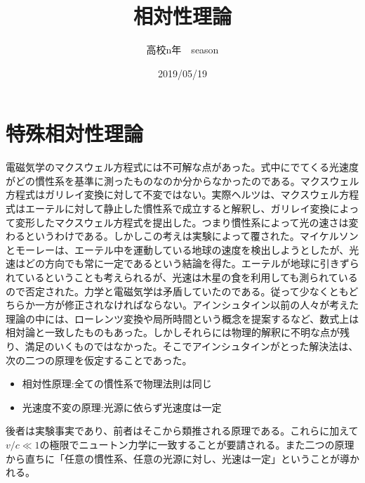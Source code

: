 \documentclass{jsarticle}
\begin{document}
\title{相対性理論}
\author{高校n年　season}
\date{2019/05/19}
\maketitle
\tableofcontents
\newcommand{\repart}[1]{\part{#1}\setcounter{section}{0}}
\newcommand{\lr}[1]{\left(#1 \right)}
\newcommand{\mlr}[1]{\left\{#1 \right\}}
\newcommand{\llr}[1]{\left[#1 \right]}
\newcommand{\rec}[1]{\frac{1}{#1}}
\newcommand{\di}[2][]{\frac{d #1}{d #2}}
\newcommand{\dd}[2][]{\frac{d^2 #1}{d #2^2}}
\newcommand{\pd}[2][]{\frac{\partial #1}{\partial #2}}
\newcommand{\ppd}[3]{\frac{\partial^2 #1}{\partial #2\partial #3}}
\newcommand{\pmat}[1]{\begin{pmatrix} #1 \end{pmatrix}}
\newcommand{\co}[1][]{\cos^{#1}\theta}
\newcommand{\si}[1][]{\sin^{#1}\theta}
\newcommand{\na}{\nabla}
\newcommand{\ga}{\gamma}
\newcommand{\Ga}{\Gamma}
\newcommand{\grad}{\mathrm{grad}}
\newcommand{\dive}{\mathrm{div}}
\newcommand{\rot}{\mathrm{rot}}
\newcommand{\pa}{\partial}
\newcommand{\chr}[2]{\left\{#1 \atop #2\right\}}
\part{特殊相対性理論}
    電磁気学のマクスウェル方程式には不可解な点があった。式中にでてくる光速度がどの慣性系を基準に測ったものなのか分からなかったのである。マクスウェル方程式はガリレイ変換に対して不変ではない。実際ヘルツは、マクスウェル方程式はエーテルに対して静止した慣性系で成立すると解釈し、ガリレイ変換によって変形したマクスウェル方程式を提出した。つまり慣性系によって光の速さは変わるというわけである。しかしこの考えは実験によって覆された。マイケルソンとモーレーは、エーテル中を運動している地球の速度を検出しようとしたが、光速はどの方向でも常に一定であるという結論を得た。エーテルが地球に引きずられているということも考えられるが、光速は木星の食を利用しても測られているので否定された。力学と電磁気学は矛盾していたのである。従って少なくともどちらか一方が修正されなければならない。アインシュタイン以前の人々が考えた理論の中には、ローレンツ変換や局所時間という概念を提案するなど、数式上は相対論と一致したものもあった。しかしそれらには物理的解釈に不明な点が残り、満足のいくものではなかった。そこでアインシュタインがとった解決法は、次の二つの原理を仮定することであった。
    \begin{itemize}
        \item 相対性原理:全ての慣性系で物理法則は同じ
        \item 光速度不変の原理:光源に依らず光速度は一定
    \end{itemize}
    後者は実験事実であり、前者はそこから類推される原理である。これらに加えて$v/c\ll 1$の極限でニュートン力学に一致することが要請される。また二つの原理から直ちに「任意の慣性系、任意の光源に対し、光速は一定」ということが導かれる。
\end{document}
